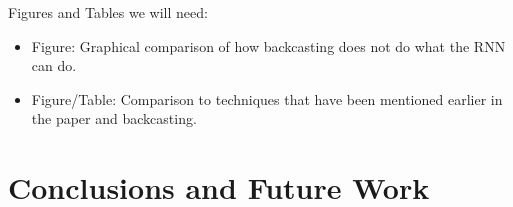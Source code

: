 \documentclass[sigconf]{acmart}
\begin{document}
Figures and Tables we will need:
\begin{itemize}
	\item Figure: Graphical comparison of how backcasting does not do what the RNN can do.
	\item Figure/Table: Comparison to techniques that have been mentioned earlier in the paper and backcasting.
\end{itemize}

\section{Conclusions and Future Work}
\label{sec:conclusions}


%	
%



%

\end{document}
